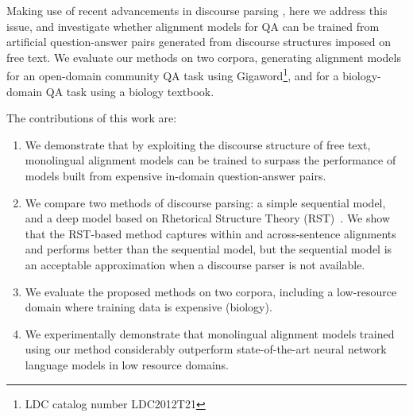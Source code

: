 Making use of recent advancements in discourse parsing \cite{feng12}, here we address this issue, and investigate whether alignment models for QA can be trained from artificial question-answer pairs generated from discourse structures imposed on free text.
We evaluate our methods on two corpora, generating alignment models for an open-domain  community QA task using Gigaword\footnote{LDC catalog number LDC2012T21}, and for a biology-domain QA task using a biology textbook. 

The contributions of this work are:
\begin{enumerate}
\vspace{-3mm}
\item We demonstrate that by exploiting the discourse structure of free text, monolingual alignment models can be trained to surpass the performance of models built from expensive in-domain question-answer pairs. 
\vspace{-3mm}
\item We compare two methods of discourse parsing: a simple sequential model, and a deep model based on Rhetorical Structure Theory (RST)~\cite{mann88}.  We show that the RST-based method captures within and across-sentence alignments and performs better than the sequential model, but the sequential model is an acceptable approximation when a discourse parser is not available.  
\vspace{-3mm}
\item We evaluate the proposed methods on two corpora, including a low-resource domain where training data is expensive (biology).
\vspace{-3mm}
\item We experimentally demonstrate that monolingual alignment models trained using our method considerably outperform state-of-the-art neural network language models in low resource domains.
\end{enumerate}










